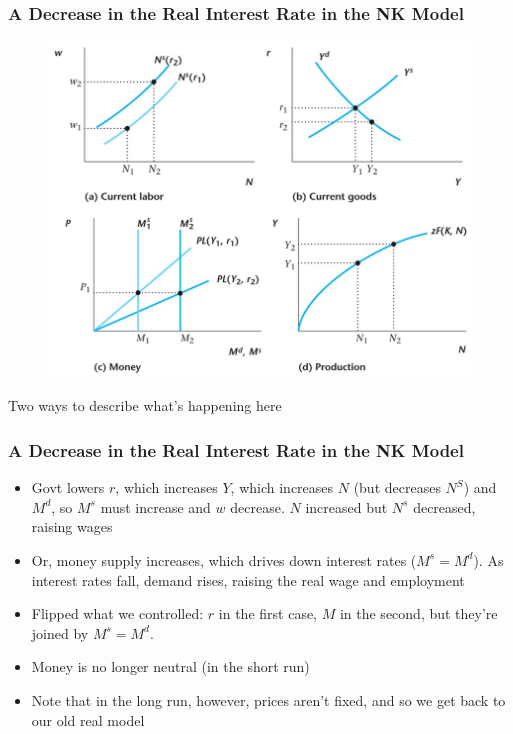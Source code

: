 \documentclass{beamer}
\begin{document}
\begin{frame}
\frametitle[alignment=center]{A Decrease in the Real Interest Rate in the NK Model}
\begin{figure}
\centering
\includegraphics[scale=0.6]{Figures/W_Fig_14pt2.png}
\end{figure}
Two ways to describe what's happening here
\end{frame}

\begin{frame}
\frametitle[alignment=center]{A Decrease in the Real Interest Rate in the NK Model}
\begin{itemize}
\item Govt lowers $r$, which increases $Y$, which increases $N$ (but decreases $N^S$) and $M^d$, so $M^s$ must increase and $w$ decrease.  $N$ increased but $N^s$ decreased, raising wages
\bigskip
\item Or, money supply increases, which drives down interest rates ($M^s=M^d$).  As interest rates fall, demand rises, raising the real wage and employment
\bigskip
\item Flipped what we controlled: $r$ in the first case, $M$ in the second, but they're joined by $M^s=M^d$. 
\bigskip 
\item Money is no longer neutral (in the short run)
\bigskip
\item Note that in the long run, however, prices aren't fixed, and so we get back to our old real model
\end{itemize}
\end{frame}
\end{document}
